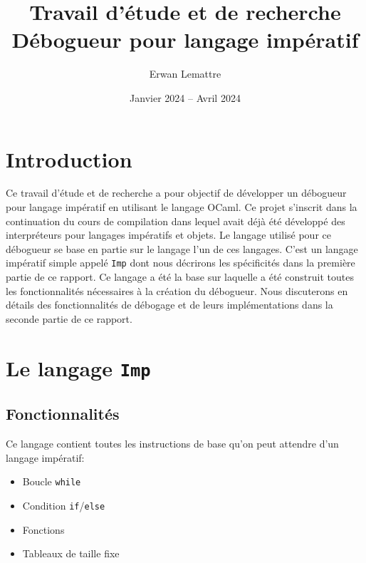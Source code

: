 \documentclass{article}
\title{Travail d'étude et de recherche\\Débogueur pour langage impératif}
\author{Erwan Lemattre}
\date{Janvier 2024 -- Avril 2024}
\begin{document}
\maketitle

\vspace{1cm}
\section{Introduction}
Ce travail d'étude et de recherche a pour objectif de développer un débogueur 
pour langage impératif en utilisant le langage OCaml. Ce projet s'inscrit dans 
la continuation du cours de compilation dans lequel avait déjà été développé 
des interpréteurs pour langages impératifs et objets. Le langage 
utilisé pour ce débogueur se base en partie sur le langage l'un de ces langages.
C'est un langage impératif simple appelé \texttt{Imp} dont nous décrirons les 
spécificités dans la première partie de ce rapport. Ce langage a été la base 
sur laquelle a été construit toutes les fonctionnalités nécessaires à la 
création du débogueur. Nous discuterons en détails des fonctionnalités de 
débogage et de leurs implémentations dans la seconde partie de ce rapport.

\newpage


\section{Le langage \texttt{Imp}}

\subsection{Fonctionnalités}
Ce langage contient toutes les instructions de base qu'on peut attendre 
d'un langage impératif:
\begin{itemize}
    \item Boucle \texttt{while}
    \item Condition \texttt{if}/\texttt{else}
    \item Fonctions
    \item Tableaux de taille fixe
\end{itemize}
\end{document}

